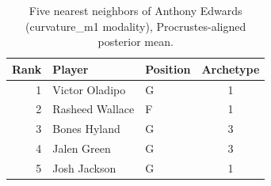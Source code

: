 \begin{table}[htbp]
  \centering\small
  \begin{tabular}{rllc}
    \toprule
    Rank & Player & Position & Archetype \\
    \midrule
    1 & Victor Oladipo & G & 1 \\
    2 & Rasheed Wallace & F & 1 \\
    3 & Bones Hyland & G & 3 \\
    4 & Jalen Green & G & 3 \\
    5 & Josh Jackson & G & 1 \\
    \bottomrule
  \end{tabular}
  \caption{Five nearest neighbors of Anthony Edwards (curvature_m1 modality), Procrustes-aligned posterior mean.}
  \label{tab:Anthony_Edwards_neighbors_curvature_m1}
\end{table}


